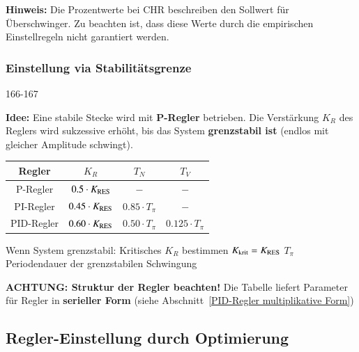 \textbf{Hinweis:} Die Prozentwerte bei CHR beschreiben den Sollwert für Überschwinger.
Zu beachten ist, dass diese Werte durch die empirischen Einstellregeln nicht garantiert werden.


\subsubsection{Einstellung via Stabilitätsgrenze}{166-167}

\textbf{Idee:} Eine stabile Stecke wird mit \textbf{P-Regler} betrieben. Die Verstärkung $K_R$ des Reglers wird sukzessive erhöht,
bis das System \textbf{grenzstabil ist} (endlos mit gleicher Amplitude schwingt).

\begin{minipage}[c]{0.55\columnwidth}
    \begin{tabular}{|c | c | c | c|}
        \toprule
        Regler      & $K_R$                     & $T_N$                 & $T_V$                 \\
        \midrule
        P-Regler    & $0.5 \cdot K_{\rm RES}$   & $-$                   & $-$                   \\
        \midrule
        PI-Regler   & $0.45 \cdot K_{\rm RES}$  & $0.85 \cdot T_{\pi}$  & $-$                   \\
        \midrule
        PID-Regler  & $0.60 \cdot K_{\rm RES}$  & $0.50 \cdot T_{\pi}$  & $0.125 \cdot T_{\pi}$ \\
        \bottomrule
    \end{tabular}
\end{minipage}
\hfill
\begin{minipage}[c]{0.42\columnwidth}
    \begin{center}
        \textbf{}
    \end{center}

    \begin{outline}
        \1 Wenn System grenzstabil: Kritisches $K_R$ bestimmen
            \2 $K_{\rm krit} = K_{\rm RES}$
        \1 $T_{\pi}$ Periodendauer der grenzstabilen Schwingung 
    \end{outline}
\end{minipage}

\textbf{ACHTUNG: Struktur der Regler beachten!} Die Tabelle liefert Parameter für Regler in \textbf{serieller Form}
(siehe Abschnitt~\ref{PID-Regler multiplikative Form}) 


\subsection{Regler-Einstellung durch Optimierung}